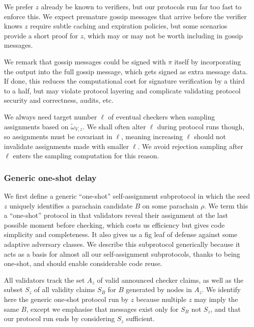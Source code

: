We prefer $z$ already be known to verifiers, but our protocols run far too fast to enforce this.  We expect premature gossip messages that arrive before the verifier knows $z$ require subtle caching and expiration policies, but some scenarios provide a short proof for $z$, which may or may not be worth including in gossip messages.

We remark that gossip messages could be signed with $\pi$ itself by incorporating the output into the full gossip message, which gets signed as extra message data.  If done, this reduces the computational cost for signature verification by a third to a half, but may violate protocol layering and complicate validating protocol security and correctness, audits, etc. 

We always need target number $\ell$ of eventual checkers when sampling assignments based on $\tilde{\omega}_{V,z}$.  We shall often alter $\ell$ during protocol runs though, so assignments must be covariant in $\ell$, meaning increasing $\ell$ should not invalidate assignments made with smaller $\ell$.  We avoid rejection sampling after $\ell$ enters the sampling computation for this reason.

\subsubsection{Generic one-shot delay}

We first define a generic ``one-shot'' self-assignment subprotocol in which the seed $z$ uniquely identifies a parachain candidate $B$ on some parachain $\rho$.  We term this a ``one-shot'' protocol in that validators reveal their assignment at the last possible moment before checking, which costs us efficiency but gives code simplicity and completeness.  It also gives us a fig leaf of defense against some adaptive adversary classes.  We describe this subprotocol generically because it acts as a basis for almost all our self-assignment subprotocols, thanks to being one-shot, and should enable considerable code reuse.  

All validators track the set $A_z$ of valid announced checker claims, as well as the subset $S_z$ of all validity claims $S_B$ for $B$ generated by nodes in $A_z$.  We identify here the generic one-shot protocol run by $z$ because multiple $z$ may imply the same $B$, except we emphasise that messages exist only for $S_B$ not $S_z$, and that our protocol run ends by considering $S_z$ sufficient.  

